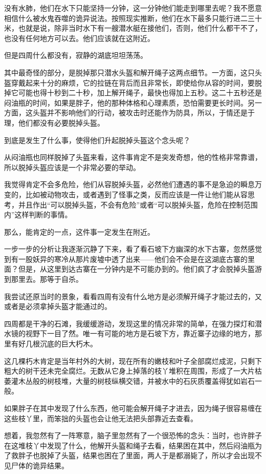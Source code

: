 没有水肺，他们在水下只能坚持一分钟，这一分钟他们能走到哪里去呢？我不愿意相信什么被水鬼吞噬的诡异说法。按照现实推断，他们在水下最多只能行进二三十米，也就是说，除非当时水下有一艘潜水艇在接他们，否则，他们什么都干不了，也没有任何地方可以去。他们应该就在这附近。

但是四周什么都没有，寂静的湖底坦坦荡荡。

其中最奇怪的部分，是脱掉那只潜水头盔和解开绳子这两点细节。一方面，这只头盔穿戴起来十分的麻烦，它的拉链在背后而且非常长，即使给你从容的时间，要脱掉它可能也得十秒到二十秒，加上解开绳子，最快也得加上五秒。这二十五秒还是闷油瓶的时间，如果是胖子，他的那种体格和心理素质，恐怕需要更长时间。另一方面，这头盔并不影响他们的行动，被攻击时还能作为防具，所以，于情还是于理，他们都没有必要脱掉头盔。

到底是发生了什么事，使得他们升起脱掉头盔这个念头呢？

从闷油瓶也同样脱掉了头盔来看，这件事肯定不是突发奇想，他的性格非常靠谱，所以脱掉头盔应该是一个非常必要的举动。

我觉得肯定不会多危险，他们从容脱掉头盔，必然他们遭遇的事不是急迫的瞬息万变的，比如被动物攻击，或者遇到了怪事之类，反而应该是一件让他们能从容思考，并且作出“可以脱掉头盔，不会有危险”或者“可以脱掉头盔，危险在控制范围内”这样判断的事情。

那么，能肯定的一点，这件事一定发生在附近。

一步一步的分析让我逐渐沉静了下来，看了看石坡下方幽深的水下古寨，忽然感觉到有一股妖异的寒冷从那片废墟中透了出来——他们会不会是在这湖底古寨的里面？但是，从这里到达古寨在一分钟内是不可能办到的。他们疯了才会脱掉头盔游到那里去。那等于自杀。

我尝试还原当时的景象，看看四周有没有什么地方是必须解开绳子才能过去的，又或者是必须拿掉头盔才能通过的。

四周都是干净的石滩，我缓缓游动，发现这里的情况非常的简单，在强力探灯和潜水镜的视野下一目了然。唯一有可能的地方是石坡下方，靠近寨子边缘的地方，那里有好几根沉底的巨大朽木。

这几棵朽木肯定是当年村外的大树，现在所有的嫩枝和叶子全部腐烂成泥，只剩下粗大的树干还未完全腐烂。无数从它身上掉落的枝丫堆积在周围，形成了一大片枯萎灌木丛般的树枝堆，大量的树枝纵横交错，并被水中的石灰质覆盖得犹如岩石一般。

如果胖子在其中发现了什么东西，他可能会解开绳子才进去，因为绳子很容易缠在这些枝丫里，而笨拙的头盔也会让他无法把头部靠近去查看。

想着，我忽然有了一阵寒意，脑子里忽然有了一个很恐怖的念头：当时，也许胖子在这堆枝丫中发现了什么，他解开头盔和绳子去看，结果困在其中，然后闷油瓶为了救胖子也脱掉了头盔，结果也困在了里面，两人于是都溺毙了，所以才会出现不见尸体的诡异结果。

